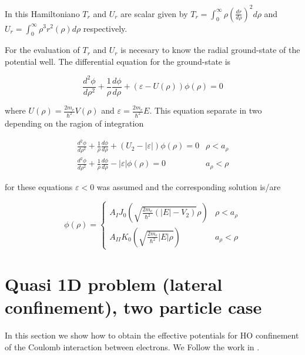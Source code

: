 \documentclass[a4paper,10pt]{article}
\begin{document}
\noindent In this Hamiltoniano $T_r$ and $U_r$ are scalar given by $T_r = \int_0^{\infty} \rho \left(\frac{dr}{d\rho}\right)^2 d\rho$ and
$U_r = \int_0^{\infty} \rho^3 r^2(\rho) d\rho$ respectively.

For the evaluation of $T_r$ and $U_r$ is necesary to know the radial ground-state of the potential well. The differential
equation for the ground-state is

\begin{equation}
\frac{d^2\phi}{d\rho^2} + \frac{1}{\rho} \frac{d\phi}{d\rho} + \left(\varepsilon - U(\rho)\right) \phi(\rho) = 0
\end{equation}

\noindent where $U(\rho) = \frac{2 m_e}{\hbar^2} V(\rho)$ and $\varepsilon = \frac{2 m_e}{\hbar^2} E$. This equation
separate in two depending on the ragion of integration

\begin{equation}
\begin{matrix}
\frac{d^2\phi}{d\rho^2} + \frac{1}{\rho} \frac{d\phi}{d\rho} + \left(U_2 - |\varepsilon|\right) \phi(\rho) = 0 & \rho<a_{\rho} \\
\frac{d^2\phi}{d\rho^2} + \frac{1}{\rho} \frac{d\phi}{d\rho} - |\varepsilon| \phi(\rho) = 0 & a_{\rho}<\rho
\end{matrix}
\end{equation}

\noindent for these equations $\varepsilon<0$ was assumed and the corresponding solution is/are

\begin{equation}
\phi(\rho) = \left\{\begin{matrix}
                      A_I J_0\left(\sqrt{\frac{2 m_e}{\hbar^2}\left(|E| - V_2\right)} \rho\right) & \rho<a_{\rho} \\
                      A_{II} K_0\left(\sqrt{\frac{2 m_e}{\hbar^2}|E| \rho}\right) & a_{\rho}<\rho
                    \end{matrix}
             \right.
\end{equation}

\section*{Quasi 1D problem (lateral confinement), two particle case}
In this section we show how to obtain the effective potentials for HO confinement of the
Coulomb interaction between electrons. We Follow the work
in \cite{bednarek_effective_2003}.
\end{document}
